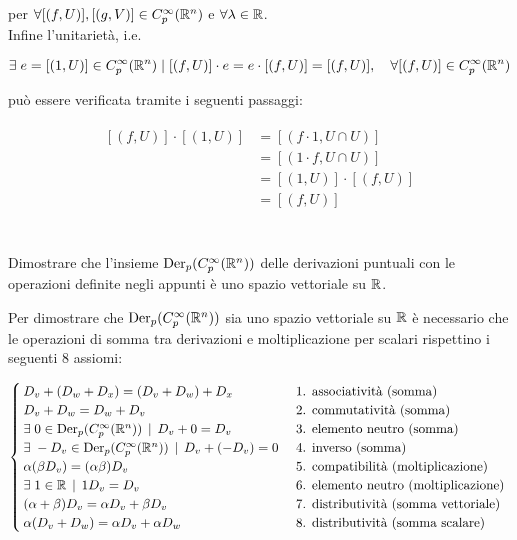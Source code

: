per $ \forall [(f,U)], [(g,V)] \in C_{p}^{\infty}(\mathbb{R}^{n}) $ e $ \forall \lambda \in \mathbb{R} $.\\
Infine l'unitarietà, i.e.

\begin{equation}
	\E e = [(1,U)] \in C_{p}^{\infty}(\R^{n}) \mid [(f,U)] \cdot e = e \cdot [(f,U)] = [(f,U)] \qcomma \forall [(f,U)] \in C_{p}^{\infty}(\R^{n})
\end{equation}

può essere verificata tramite i seguenti passaggi:

\begin{align}
	\begin{split}
		[(f,U)] \cdot [(1,U)] &= [(f \cdot 1,U \cap U)]\\
		&= [(1 \cdot f,U \cap U)]\\
		&= [(1,U)] \cdot [(f,U)]\\
		&= [(f,U)]
	\end{split}
\end{align}

%

\newpage

%

\section{}\label{es1-8}

\begin{tcolorbox}
	Dimostrare che l'insieme $ \operatorname{Der}_{p}(C_{p}^{\infty}(\mathbb{R}^{n})) $ delle derivazioni puntuali con le operazioni definite negli appunti è uno spazio vettoriale su $ \mathbb{R} $.
\end{tcolorbox}

Per dimostrare che $ \operatorname{Der}_{p}(C_{p}^{\infty}(\mathbb{R}^{n})) $ sia uno spazio vettoriale su $ \mathbb{R} $ è necessario che le operazioni di somma tra derivazioni e moltiplicazione per scalari rispettino i seguenti 8 assiomi:

\begin{equation}
	\begin{cases}
		D_{v} + (D_{w} + D_{x}) = (D_{v} + D_{w}) + D_{x} & \text{ 1. associatività (somma) }\\
		D_{v} + D_{w} = D_{w} + D_{v} & \text{ 2. commutatività (somma) }\\
		\exists \; 0 \in \operatorname{Der}_{p}(C_{p}^{\infty}(\mathbb{R}^{n})) \, \mid \, D_{v} + 0 = D_{v} & \text{ 3. elemento neutro (somma) }\\
		\exists \; - D_{v} \in \operatorname{Der}_{p}(C_{p}^{\infty}(\mathbb{R}^{n})) \, \mid \, D_{v} + (- D_{v}) = 0 & \text{ 4. inverso (somma) }\\
		\alpha (\beta D_{v}) = (\alpha \beta) D_{v} & \text{ 5. compatibilità (moltiplicazione) }\\
		\exists \; 1 \in \mathbb{R} \, \mid \, 1 D_{v} = D_{v} & \text{ 6. elemento neutro (moltiplicazione) }\\
		(\alpha + \beta) D_{v} = \alpha D_{v} + \beta D_{v} & \text{ 7. distributività (somma vettoriale) }\\
		\alpha (D_{v} + D_{w}) = \alpha D_{v} + \alpha D_{w} & \text{ 8. distributività (somma scalare) }
	\end{cases}
\end{equation}

